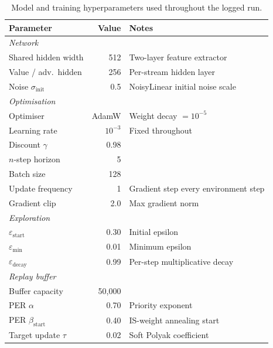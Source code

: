 \documentclass[11pt]{article}
\begin{document}
\begin{table}[htbp]
  \centering
  \caption{Model and training hyperparameters used throughout the
    logged run.}
  \label{tab:hyper}
  \begin{tabular}{lrl}
    \toprule
    Parameter & Value & Notes \\
    \midrule
    \multicolumn{3}{l}{\textit{Network}} \\
    Shared hidden width   & 512     & Two-layer feature extractor \\
    Value / adv.\ hidden  & 256     & Per-stream hidden layer \\
    Noise $\sigma_\text{init}$ & 0.5 & NoisyLinear initial noise scale \\[2pt]
    \multicolumn{3}{l}{\textit{Optimisation}} \\
    Optimiser             & AdamW   & Weight decay $= 10^{-5}$ \\
    Learning rate         & $10^{-3}$ & Fixed throughout \\
    Discount $\gamma$     & 0.98    & \\
    $n$-step horizon      & 5       & \\
    Batch size            & 128     & \\
    Update frequency      & 1       & Gradient step every environment step \\
    Gradient clip         & 2.0     & Max gradient norm \\[2pt]
    \multicolumn{3}{l}{\textit{Exploration}} \\
    $\varepsilon_\text{start}$ & 0.30 & Initial epsilon \\
    $\varepsilon_\text{min}$   & 0.01 & Minimum epsilon \\
    $\varepsilon_\text{decay}$ & 0.99 & Per-step multiplicative decay \\[2pt]
    \multicolumn{3}{l}{\textit{Replay buffer}} \\
    Buffer capacity       & 50{,}000 & \\
    PER $\alpha$          & 0.70    & Priority exponent \\
    PER $\beta_\text{start}$ & 0.40 & IS-weight annealing start \\
    Target update $\tau$  & 0.02    & Soft Polyak coefficient \\
    \bottomrule
  \end{tabular}
\end{table}

\end{document}
